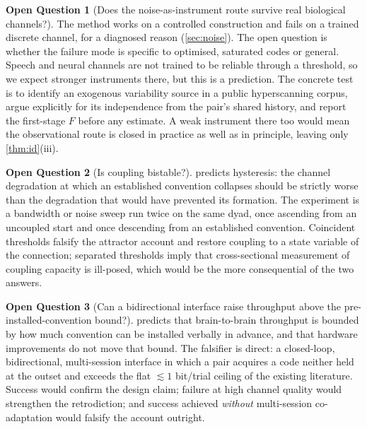 \documentclass[11pt,a4paper]{article}
\theoremstyle{plain}
\theoremstyle{definition}
\newtheorem{question}{Open Question}
\theoremstyle{remark}
\begin{document}
\begin{question}[Does the noise-as-instrument route survive real biological channels?]\label{q:hyper}
The method works on a controlled construction and fails on a trained discrete channel, for a diagnosed reason
(\cref{sec:noise}). The open question is whether the failure mode is specific to optimised, saturated codes or
general. Speech and neural channels are not trained to be reliable through a threshold, so we expect stronger
instruments there, but this is a prediction. The concrete test is to identify an exogenous variability source in
a public hyperscanning corpus, argue explicitly for its independence from the pair's shared history, and report
the first-stage $F$ before any estimate. A weak instrument there too would mean the observational route is closed
in practice as well as in principle, leaving only \cref{thm:id}(iii).
\end{question}

\begin{question}[Is coupling bistable?]\label{q:hysteresis}
 predicts hysteresis: the channel degradation at which an established convention collapses should
be strictly worse than the degradation that would have prevented its formation. The experiment is a bandwidth or
noise sweep run twice on the same dyad, once ascending from an uncoupled start and once descending from an
established convention. Coincident thresholds falsify the attractor account and restore coupling to a state
variable of the connection; separated thresholds imply that cross-sectional measurement of coupling capacity is
ill-posed, which would be the more consequential of the two answers.
\end{question}

\begin{question}[Can a bidirectional interface raise throughput above the pre-installed-convention
bound?]\label{q:bbi}
 predicts that brain-to-brain throughput is bounded by how much convention can be installed
verbally in advance, and that hardware improvements do not move that bound. The falsifier is direct: a
closed-loop, bidirectional, multi-session interface in which a pair acquires a code neither held at the outset
and exceeds the flat $\lesssim 1$ bit/trial ceiling of the existing literature. Success would confirm the design
claim; failure at high channel quality would strengthen the retrodiction; and success achieved \emph{without}
multi-session co-adaptation would falsify the account outright.
\end{question}
\end{document}
